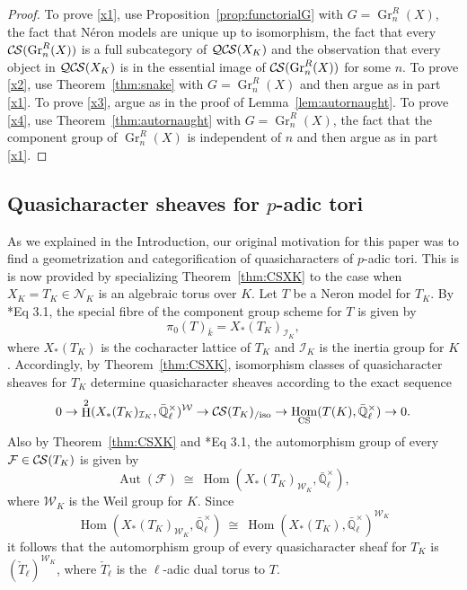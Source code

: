 \documentclass[10pt]{amsart}
\theoremstyle{plain}
\theoremstyle{definition}
\theoremstyle{remark}
\newcommand{\EE}{\mathbb{\bar Q}_\ell}
\newcommand{\bFq}{\bar{k}}
\newcommand{\EEx}{\EE^\times}
\newcommand{\Weil}[1]{\mathcal{W}_{#1}}
\DeclareMathOperator{\Aut}{Aut}
\DeclareMathOperator{\Hom}{Hom}
\DeclareMathOperator{\Gr}{Gr}
\DeclareMathOperator{\Hh}{H}
\newcommand{\iso}{{\ \cong\ }}
\newcommand{\cs}[1]{{\mathcal{#1}}}
\newcommand{\CS}{{\mathcal{C\hskip-0.8pt S}}}
\newcommand{\CSiso}[1]{\CS(#1)_{/\text{iso}}}
\newcommand{\QCS}{{\mathcal{QC\hskip-0.8pt S}}}
\begin{document}
\begin{proof}
To prove \ref{x1}, use Proposition~\ref{prop:functorialG} with $G = \Gr^R_n(X)$, the fact that N\'eron models are unique up to isomorphism, the fact that every $\CS(\Gr^R_n(X))$ is a full subcategory of $\QCS(X_K)$ and the observation that every object in $\QCS(X_K)$ is in the essential image of $\CS(\Gr^R_n(X))$ for some $n$.
To prove \ref{x2}, use Theorem~\ref{thm:snake} with $G = \Gr^R_n(X)$ and then argue as in part \ref{x1}.
To prove \ref{x3}, argue as in the proof of Lemma~\ref{lem:autornaught}.
To prove \ref{x4}, use Theorem~\ref{thm:autornaught} with $G = \Gr^R_n(X)$, the fact that the component group of $\Gr^R_n(X)$ is independent of $n$ and then argue as in part \ref{x1}.
\end{proof}

\subsection{Quasicharacter sheaves for $p$-adic tori} \label{ssec:CS_tori}

As we explained in the Introduction, our original motivation for this paper was to find a geometrization and categorification of quasicharacters of $p$-adic tori. 
This is is now provided by specializing Theorem~\ref{thm:CSXK} to the case when $X_K= T_K\in \mathcal{N}_K$ is an algebraic torus over $K$. 
Let $T$ be a Neron model for $T_K$.
By \cite{bitan:discriminant}*{Eq 3.1}, the special fibre of the component group scheme for $T$ is given by
\[
 \pi_0(T)_{\bFq} = X_*(T_K)_{\mathcal{I}_K},
\]
where $X_*(T_K)$ is the cocharacter lattice of $T_K$ and $\mathcal{I}_K$ is the inertia group for $K$.
Accordingly, by Theorem~\ref{thm:CSXK}, isomorphism classes of quasicharacter sheaves for $T_K$ determine quasicharacter sheaves according to the exact sequence
\[
0 \to \Hh^2(X_*(T_K)_{\mathcal{I}_K},\EEx)^{\Weil{}} \to \CSiso{T_K} \to \Hom_\text{CS}(T(K),\EEx) \to 0.
\]
Also by Theorem~\ref{thm:CSXK} and \cite{bitan:discriminant}*{Eq 3.1}, the automorphism group of every $\cs{F} \in \CS(T_K)$ is given by 
\[
\Aut(\cs{F}) \iso \Hom(X_*(T_K)_{\Weil{K}},\EEx),
\]
where $\Weil{K}$ is the Weil group for $K$. 
Since 
\[
\Hom(X_*(T_K)_{\Weil{K}},\EEx) \iso \Hom(X_*(T_K),\EEx)^{\Weil{K}}
\]
it follows that the automorphism group of every quasicharacter sheaf for $T_K$ is $(\check{T}_\ell)^{\Weil{K}}$, where $\check{T}_\ell$ is the $\ell$-adic dual torus to $T$.
\end{document}
